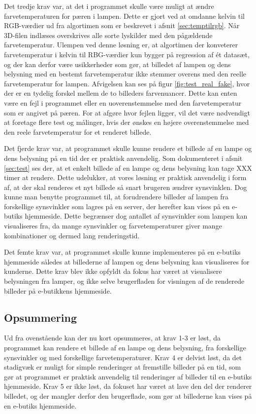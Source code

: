 Det tredje krav var, at det i programmet skulle være muligt at ændre farvetemperaturen for pæren i lampen. Dette er gjort ved at omdanne kelvin til RGB-værdier ud fra algortimen som er beskrevet i afsnit \ref{sec:temptilrgb}. Når 3D-filen indlæses overskrives alle sorte lyskilder med den pågældende farvetemperatur. Ulempen ved denne løsning er, at algortimen der konveterer farvetemperatur i kelvin til RBG-værdier kun bygger på regression af ét datasæt, og der kan derfor være usikkerheder som gør, at billedet af lampen og dens belysning med en bestemt farvetemperatur ikke stemmer overens med den reelle farvetemperatur for lampen. Afvigelsen kan ses på figur \ref{fig:test_real_fake}, hvor der er en tydelig forskel mellem de to billeders farvenuancer. Dette kan enten være en fejl i programmet eller en uoverenstemmelse med den farvetemperatur som er angivet på pæren. For at afgøre hvor fejlen ligger, vil det være nødvendigt at foretage flere test og målinger, hvis der ønskes en højere overenstemmelse med den reele farvetemperatur for et renderet billede. 

Det fjerde krav var, at programmet skulle kunne rendere et billede af en lampe og dens belysning på en tid der er praktisk anvendelig. Som dokumenteret i afsnit \ref{sec:test} ses der, at et enkelt billede af en lampe og dens belysning kan tage XXX timer at rendere. Dette udelukker, at vores løsning er praktisk anvendelig i form af, at der skal renderes et nyt billede så snart brugeren ændrer synsvinklen. Dog kunne man benytte programmet til, at forudrendere billeder af lampen fra forskellige synsvinkler som lagres på en server, der herefter kan vises på en e-butiks hjemmeside. Dette begrænser dog antallet af synsvinkler som lampen kan visualiseres fra, da mange synsvinkler og farvetemperaturer giver mange kombinationer og dermed lang renderingstid. 

Det femte krav var, at programmet skulle kunne implementeres på en e-butiks hjemmeside således at billederne af lampen og dens belysning kan visualiseres for kunderne. Dette krav blev ikke opfyldt da fokus har været at visualisere belysningen fra lamper, og ikke selve brugerfladen for visningen af de renderede billeder på e-butikkens hjemmeside.  

\subsection*{Opsummering}

Ud fra ovenstående kan der nu kort opsummeres, at krav 1-3 er løst, da programmet kan rendere et billede af en lampe og dens belysning, fra forskellige synsvinkler og med forskellige farvetemperaturer. Krav 4 er delvist løst, da det stadigvæk er muligt for simple renderinger at fremstille billeder på en tid, som gør at programmet er praktisk anvendelig til renderinger af billeder til en e-butiks hjemmeside. Krav 5 er ikke løst, da fokuset har været at lave den del der renderer billedet, og der mangler derfor den brugerflade, som gør at billederne kan vises på en e-butiks hjemmeside. 


